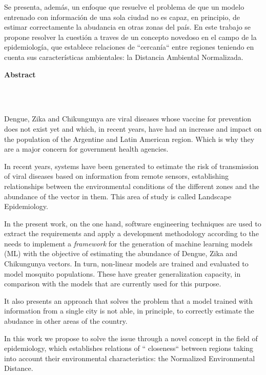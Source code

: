   \par Se presenta, además, un enfoque que resuelve el problema de que
    un modelo entrenado con información de una sola ciudad no es capaz,
    en principio, de estimar correctamente la abudancia en otras zonas del país.
    En este trabajo
    se propone resolver la cuestión a traves de un concepto novedoso en el campo
    de la epidemiología, que establece
    relaciones de ``cercanía``
    entre regiones teniendo en cuenta sus características
    ambientales: la Distancia Ambiental Normalizada.


\newpage

\textbf{\LARGE Abstract}
\\\\

\par Dengue, Zika and Chikungunya are viral diseases whose vaccine for
  prevention does not exist yet and which, in recent years, have had an
  increase and impact on the population of the Argentine and Latin American region.
  Which is why they are a major concern for government health agencies.


\par In recent years, systems have been generated to estimate the risk of
  transmission of viral diseases based on information from remote sensors,
  establishing relationships between the environmental conditions of the
  different zones and the abundance of the vector in them.
  This area of study is called Landscape Epidemiology.


\par In the present work, on the one hand, software engineering techniques
  are used to extract the requirements and apply a development methodology
  according to the needs
  to implement a \textit{framework} for the generation of machine learning
  models (ML) with the objective of estimating the abundance of Dengue, Zika and Chikungunya vectors.
  In turn, non-linear models are trained and evaluated to model mosquito populations.
  These have greater generalization capacity, in comparison with the models
  that are currently used for this purpose.

\par It also presents an approach that solves the problem that a model trained
  with information from a single city is not able, in principle, to correctly
  estimate the abudance in other areas of the country.

\par In this work we propose to solve the issue through a novel concept in the
  field of epidemiology, which establishes relations of `` closeness`` between
  regions taking into account their environmental characteristics:
  the Normalized Environmental Distance.

